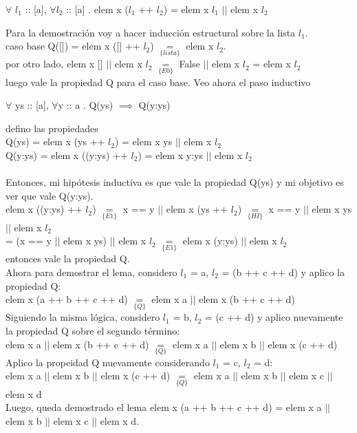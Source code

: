 \documentclass[10pt,a4paper]{article}
\begin{document}
\begin{center}
	$\forall$ $l_1$ :: [a], $\forall$$l_2$ :: [a] . elem x ($l_1$ ++ $l_2$) = elem x $l_1$ $||$ elem x $l_2$
\end{center}
Para la demostración voy a hacer inducción estructural sobre la lista $l_1$. \\
caso base Q([]) = elem x ([] ++ $l_2$) $\underset{\{lista\}}{=}$ elem x $l_2$. \\
por otro lado, elem x [] $||$ elem x $l_2$ $\underset{\{E0\}}{=}$ False $||$ elem x $l_2$ = elem x $l_2$ \\
luego vale la propiedad Q para el caso base. Veo ahora el paso inductivo
\begin{center}
	$\forall$ ys :: [a], $\forall$y :: a . Q(ys) $\implies$ Q(y:ys)
\end{center}
defino las propiedades \\
Q(ys) = elem x (ys ++ $l_2$) = elem x ys $||$ elem x $l_2$ \\
Q(y:ys) = elem x ((y:ys) ++ $l_2$) = elem x y:ys $||$ elem x $l_2$ \\ \\
Entonces, mi hipótesis inductiva es que vale la propiedad Q(ys) y mi objetivo es ver que vale Q(y:ys). \\
elem x ((y:ys) ++ $l_2$) $\underset{\{E1\}}{=}$ x == y $||$ elem x (ys ++ $l_2$) $\underset{\{HI\}}{=}$ x == y $||$ elem x ys $||$ elem x $l_2$ \\
= (x == y $||$ elem x ys) $||$ elem x $l_2$ $\underset{\{E1\}}{=}$ elem x (y:ys) $||$ elem x $l_2$ \\
entonces vale la propiedad Q. \\
Ahora para demostrar el lema, considero $l_1$ = a, $l_2$ = (b ++ c ++ d) y aplico la propiedad Q: \\
elem x (a ++ b ++ c ++ d) $\underset{\{Q\}}{=}$ elem x a $||$ elem x (b ++ c ++ d) \\
Siguiendo la misma lógica, considero $l_1$ = b, $l_2$ = (c ++ d) y aplico nuevamente la propiedad Q sobre el segundo término: \\
elem x a $||$ elem x (b ++ c ++ d) $\underset{\{Q\}}{=}$ elem x a $||$ elem x b $||$ elem x (c ++ d) \\
Aplico la propeidad Q nuevamente considerando $l_1$ = c, $l_2$ = d: \\
elem x a $||$ elem x b $||$ elem x (c ++ d) $\underset{\{Q\}}{=}$ elem x a $||$ elem x b $||$ elem x c $||$ elem x d \\
Luego, queda demostrado el lema elem x (a ++ b ++ c ++ d) = elem x a $||$ elem x b $||$ elem x c $||$ elem x d.
\end{document}
